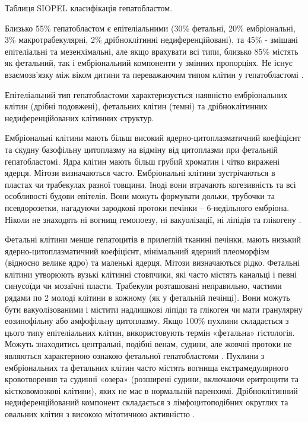 Таблиця SIOPEL класифікація гепатобластом.


Близько 55\% гепатобластом є епітеліальними (30\% фетальні, 20\% ембріональні, 3\% макротрабекулярні, 2\% дрібноклітинні недиференційовані), та 45\% - змішані епітеліальні та мезенхімальні, але якщо врахувати всі типи, близько 85\% містять як фетальний, так і ембріональний компоненти у змінних пропорціях. Не існує взаємозв’язку між віком дитини та переважаючим типом клітин у гепатобластомі \cite{pmid20345611}.

Епітеліальний тип гепатобластоми характеризується наявністю ембріональних клітин (дрібні подовжені), фетальних клітин (темні) та дрібноклітинних недиференційованих клітинних структур. 

Ембріональні  клітини мають більш високий ядерно-цитоплазматичний коефіцієнт та скудну базофільну цитоплазму на відміну від цитоплазми при фетальній гепатобластомі. Ядра клітин мають більш грубий хроматин і чітко виражені ядерця. Мітози визначаються часто. Ембріональні клітини зустрічаються в пластах чи трабекулах разної товщини. Іноді  вони втрачають когезивність та всі особливості будови епітелія. Вони можуть формувати дольки, трубочки та псевдорозетки, нагадуючи зародкові протоки печінки – 6-недільного ембріона. Ніколи не знаходять ні вогнищ гемопоезу, ні вакуолізації, ні ліпідів та глікогену \cite{pmid20922397}.

Фетальні клітини менше гепатоцитів в прилеглій тканині печінки, мають низький ядерно-цитоплазматичний коефіцієнт, мінімальний ядерний плеоморфізм (відносно велике ядро) та маленькі ядерця. Мітози визначаються рідко. Фетальні клітини утворюють вузькі клітинні стовпчики, які часто містять канальці і певні  синусоїди чи мозаїчні пласти. Трабекули розташовані неправильно, частими рядами по 2 молоді клітини в кожному (як у фетальній печінці). Вони можуть бути вакуолізованими і містити надлишкові ліпіди та глікоген чи мати гранулярну еозинофільну або амфофільну цитоплазму. Якщо 100\% пухлини складається з цього типу епітеліальних клітин, використовують термін «фетальна» гістологія. Можуть знаходитись центральні, подібні венам, судини, але жовчні протоки не являються характерною ознакою фетальної гепатобластоми \cite{pmid18970927}.
Пухлини з ембріональних та фетальних клітин часто містять вогнища екстрамедулярного кровотворення та судинні «озера» (розширені судини, включаючи еритроцити та кістковомозкові клітини), яких не має в нормальній паренхимі.
Дрібноклітинний недиференційований компонент складається з лімфоцитоподібних округлих та овальних клітин з високою мітотичною активністю \cite{pmid2544067}.

